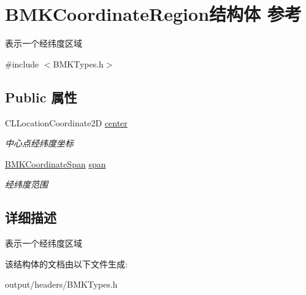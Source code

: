 \hypertarget{struct_b_m_k_coordinate_region}{}\section{B\+M\+K\+Coordinate\+Region结构体 参考}
\label{struct_b_m_k_coordinate_region}


表示一个经纬度区域  




{\ttfamily \#include $<$B\+M\+K\+Types.\+h$>$}

\subsection*{Public 属性}
\begin{DoxyCompactItemize}
\item 
\hypertarget{struct_b_m_k_coordinate_region_a298c069df033a5690fdebc3c63f86903}{}C\+L\+Location\+Coordinate2\+D \hyperlink{struct_b_m_k_coordinate_region_a298c069df033a5690fdebc3c63f86903}{center}\label{struct_b_m_k_coordinate_region_a298c069df033a5690fdebc3c63f86903}

\begin{DoxyCompactList}\small\item\em 中心点经纬度坐标 \end{DoxyCompactList}\item 
\hypertarget{struct_b_m_k_coordinate_region_a75e65758cbbf7cb3ed6007d4ce301292}{}\hyperlink{struct_b_m_k_coordinate_span}{B\+M\+K\+Coordinate\+Span} \hyperlink{struct_b_m_k_coordinate_region_a75e65758cbbf7cb3ed6007d4ce301292}{span}\label{struct_b_m_k_coordinate_region_a75e65758cbbf7cb3ed6007d4ce301292}

\begin{DoxyCompactList}\small\item\em 经纬度范围 \end{DoxyCompactList}\end{DoxyCompactItemize}


\subsection{详细描述}
表示一个经纬度区域 

该结构体的文档由以下文件生成\+:\begin{DoxyCompactItemize}
\item 
output/headers/B\+M\+K\+Types.\+h\end{DoxyCompactItemize}
